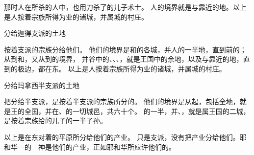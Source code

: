 {那时{}人在所杀的人中，也用刀杀了{}的儿子术士{}。
人的境界就是{}与靠近{}的地。以上是{}人按着宗族所得为业的诸城，并属城的村庄。
\par }{\SH 分给迦得支派的土地
\par }{\PP {}按着{}支派的宗族分给他们{}。
他们的境界是{}和{}的各城，并{}人的一半地，直到{}前的{}；
从{}到{}和{}，又从{}到{}的境界，
并谷中的{}、{}、{}、{}，就是{}王{}国中的余地，以及{}与靠近{}的地，直到{}的极边，都在{}东。
以上是{}人按着宗族所得为业的诸城，并属城的村庄。
\par }{\SH 分给玛拿西半支派的土地
\par }{\PP {}把{}分给{}半支派，是按着{}半支派的宗族所分的。
他们的境界是从{}起，包括{}全地，就是{}王{}的全国，并在{}、{}的一切城邑，共六十个。
的一半，并{}、{}，就是属{}王{}国的二城，是按着宗族给{}的儿子{}的一半子孙。
\par }{\PP {}以上是{}在{}东对着{}的{}平原所分给他们的产业。
只是{}支派，{}没有把产业分给他们。耶和华—{}的　神是他们的产业，正如耶和华所应许他们的。

}
